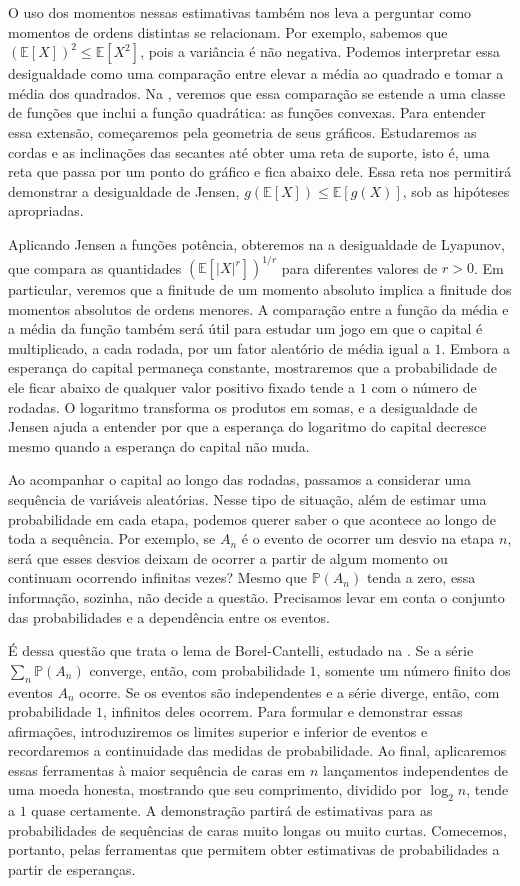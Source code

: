 \documentclass[12pt,portuguese]{article}
\theoremstyle{definition}
\theoremstyle{plainexercise}
\theoremstyle{starredexercise}
\theoremstyle{definition}
\begin{document}
O uso dos momentos nessas estimativas também nos leva a perguntar como
momentos de ordens distintas se relacionam. Por exemplo, sabemos que
$(\mathbb{E}[X])^2\leqslant\mathbb{E}[X^2]$, pois a variância é não
negativa. Podemos interpretar essa desigualdade como uma comparação entre
elevar a média ao quadrado e tomar a média dos quadrados. Na
, veremos que essa comparação se estende a uma classe
de funções que inclui a função quadrática: as funções convexas. Para
entender essa extensão, começaremos pela geometria de seus gráficos.
Estudaremos as cordas e as inclinações das secantes até obter uma reta de
suporte, isto é, uma reta que passa por um ponto do gráfico e fica abaixo
dele. Essa reta nos permitirá demonstrar a desigualdade de Jensen,
$g(\mathbb{E}[X])\leqslant\mathbb{E}[g(X)]$, sob as hipóteses apropriadas.

Aplicando Jensen a funções potência, obteremos na  a
desigualdade de Lyapunov, que compara as quantidades
$(\mathbb{E}[|X|^r])^{1/r}$ para diferentes valores de $r>0$. Em particular,
veremos que a finitude de um momento absoluto implica a finitude dos momentos
absolutos de ordens menores. A comparação entre a função da média e a média
da função também será útil para estudar um jogo em que o capital é
multiplicado, a cada rodada, por um fator aleatório de média igual a $1$.
Embora a esperança do capital permaneça constante, mostraremos que a
probabilidade de ele ficar abaixo de qualquer valor positivo fixado tende a
$1$ com o número de rodadas. O logaritmo transforma os produtos em somas, e a
desigualdade de Jensen ajuda a entender por que a esperança do logaritmo do
capital decresce mesmo quando a esperança do capital não muda.

Ao acompanhar o capital ao longo das rodadas, passamos a considerar uma
sequência de variáveis aleatórias. Nesse tipo de situação, além de estimar
uma probabilidade em cada etapa, podemos querer saber o que acontece ao
longo de toda a sequência. Por exemplo, se $A_n$ é o evento de ocorrer um
desvio na etapa $n$, será que esses desvios deixam de ocorrer a partir de
algum momento ou continuam ocorrendo infinitas vezes? Mesmo que
$\mathbb{P}(A_n)$ tenda a zero, essa informação, sozinha, não decide a
questão. Precisamos levar em conta o conjunto das probabilidades e a
dependência entre os eventos.

É dessa questão que trata o lema de Borel-Cantelli, estudado na
. Se a série $\sum_n\mathbb{P}(A_n)$ converge,
então, com probabilidade $1$, somente um número finito dos eventos $A_n$
ocorre. Se os eventos são independentes e a série diverge, então, com
probabilidade $1$, infinitos deles ocorrem. Para formular e demonstrar essas
afirmações, introduziremos os limites superior e inferior de eventos e
recordaremos a continuidade das medidas de probabilidade. Ao final,
aplicaremos essas ferramentas à maior sequência de caras em $n$ lançamentos
independentes de uma moeda honesta, mostrando que seu comprimento, dividido
por $\log_2 n$, tende a $1$ quase certamente. A demonstração partirá de
estimativas para as probabilidades de sequências de caras muito longas ou
muito curtas. Comecemos, portanto, pelas ferramentas que permitem obter
estimativas de probabilidades a partir de esperanças.
\end{document}

